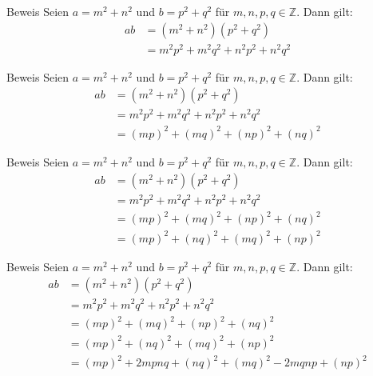 \documentclass[10pt]{beamer}
\def\bZ{\mathbb{Z}}
\begin{document}
\begin{frame}{Beweis}
    Seien \( a = m^{2} + n^{2} \) und \( b = p^{2} + q^{2} \) für \( m, n, p, q \in \bZ \). Dann gilt:
    \begin{align*}
        ab
        & = \left( m^{2} + n^{2} \right) \left( p^{2} + q^{2} \right) \\
        & = m^{2}p^{2} + m^{2}q^{2} + n^{2}p^{2} + n^{2}q^{2}
    \end{align*}
\end{frame}



\begin{frame}{Beweis}
    Seien \( a = m^{2} + n^{2} \) und \( b = p^{2} + q^{2} \) für \( m, n, p, q \in \bZ \). Dann gilt:
    \begin{align*}
        ab
        & = \left( m^{2} + n^{2} \right) \left( p^{2} + q^{2} \right) \\
        & = m^{2}p^{2} + m^{2}q^{2} + n^{2}p^{2} + n^{2}q^{2} \\
        & = \left( mp \right)^{2} + \left( mq \right)^{2} + \left( np \right)^{2} + \left( nq \right)^{2}
    \end{align*}
\end{frame}



\begin{frame}{Beweis}
    Seien \( a = m^{2} + n^{2} \) und \( b = p^{2} + q^{2} \) für \( m, n, p, q \in \bZ \). Dann gilt:
    \begin{align*}
        ab
        & = \left( m^{2} + n^{2} \right) \left( p^{2} + q^{2} \right) \\
        & = m^{2}p^{2} + m^{2}q^{2} + n^{2}p^{2} + n^{2}q^{2} \\
        & = \left( mp \right)^{2} + \left( mq \right)^{2} + \left( np \right)^{2} + \left( nq \right)^{2} \\
        & = \left( mp \right)^{2} + \left( nq \right)^{2} + \left( mq \right)^{2} + \left( np \right)^{2} 
    \end{align*}
\end{frame}



\begin{frame}{Beweis}
    Seien \( a = m^{2} + n^{2} \) und \( b = p^{2} + q^{2} \) für \( m, n, p, q \in \bZ \). Dann gilt:
    \begin{align*}
        ab
        & = \left( m^{2} + n^{2} \right) \left( p^{2} + q^{2} \right) \\
        & = m^{2}p^{2} + m^{2}q^{2} + n^{2}p^{2} + n^{2}q^{2} \\
        & = \left( mp \right)^{2} + \left( mq \right)^{2} + \left( np \right)^{2} + \left( nq \right)^{2} \\
        & = \left( mp \right)^{2} + \left( nq \right)^{2} + \left( mq \right)^{2} + \left( np \right)^{2} \\
        & = \left( mp \right)^{2} + 2mpnq + \left( nq \right)^{2} + \left( mq \right)^{2} - 2mqnp + \left( np \right)^{2} \\
    \end{align*}
\end{frame}
\end{document}

